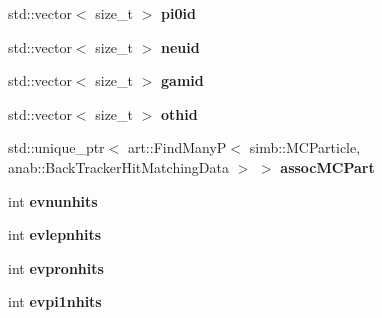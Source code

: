 \begin{DoxyCompactItemize}
\item 
std\+::vector$<$ size\+\_\+t $>$ {\bfseries pi0id}\hypertarget{classanalysis_1_1SlicePurCompl_aaa4d7b9339cb5e7e1b2abce6b4784532}{}\label{classanalysis_1_1SlicePurCompl_aaa4d7b9339cb5e7e1b2abce6b4784532}

\item 
std\+::vector$<$ size\+\_\+t $>$ {\bfseries neuid}\hypertarget{classanalysis_1_1SlicePurCompl_a1f6b97343b50a45f6d08c9b7a77cafc8}{}\label{classanalysis_1_1SlicePurCompl_a1f6b97343b50a45f6d08c9b7a77cafc8}

\item 
std\+::vector$<$ size\+\_\+t $>$ {\bfseries gamid}\hypertarget{classanalysis_1_1SlicePurCompl_a4123f24a7b7c48a0b8d035d8f6cd8855}{}\label{classanalysis_1_1SlicePurCompl_a4123f24a7b7c48a0b8d035d8f6cd8855}

\item 
std\+::vector$<$ size\+\_\+t $>$ {\bfseries othid}\hypertarget{classanalysis_1_1SlicePurCompl_ab09dc6647525b89ebee6e9ee622cce58}{}\label{classanalysis_1_1SlicePurCompl_ab09dc6647525b89ebee6e9ee622cce58}

\item 
std\+::unique\+\_\+ptr$<$ art\+::\+Find\+ManyP$<$ simb\+::\+M\+C\+Particle, anab\+::\+Back\+Tracker\+Hit\+Matching\+Data $>$ $>$ {\bfseries assoc\+M\+C\+Part}\hypertarget{classanalysis_1_1SlicePurCompl_aa8a4a1c33e45d41c5cbd930fd55e2450}{}\label{classanalysis_1_1SlicePurCompl_aa8a4a1c33e45d41c5cbd930fd55e2450}

\item 
int {\bfseries evnunhits}\hypertarget{classanalysis_1_1SlicePurCompl_abb4d90c2bccf98be8583ee7ec4786e7b}{}\label{classanalysis_1_1SlicePurCompl_abb4d90c2bccf98be8583ee7ec4786e7b}

\item 
int {\bfseries evlepnhits}\hypertarget{classanalysis_1_1SlicePurCompl_acb6c47c5f5079404267f46ad6ccd843e}{}\label{classanalysis_1_1SlicePurCompl_acb6c47c5f5079404267f46ad6ccd843e}

\item 
int {\bfseries evpronhits}\hypertarget{classanalysis_1_1SlicePurCompl_a3b7e6beaede5fdaab4b4d58e3702fea1}{}\label{classanalysis_1_1SlicePurCompl_a3b7e6beaede5fdaab4b4d58e3702fea1}

\item 
int {\bfseries evpi1nhits}\hypertarget{classanalysis_1_1SlicePurCompl_a2b450063c61b0408260de63628f3d544}{}\label{classanalysis_1_1SlicePurCompl_a2b450063c61b0408260de63628f3d544}


\end{DoxyCompactItemize}
